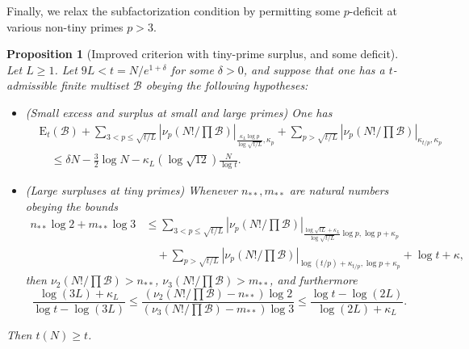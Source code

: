 \documentclass[12pt,a4paper,reqno]{amsart}
\numberwithin{equation}{section}
\theoremstyle{plain}
\newtheorem{proposition}[theorem]{Proposition}
\theoremstyle{definition}
\newcommand\tuple{{\mathcal B}}
\newcommand\excess{{\mathrm{E}}}
\begin{document}
Finally, we relax the subfactorization condition by permitting some $p$-deficit at various non-tiny primes $p>3$.

\begin{proposition}[Improved criterion with tiny-prime surplus, and some deficit]\label{balance-23''}  Let $L \geq 1$.  Let $9L < t = N/e^{1+\delta}$ for some $\delta>0$, and suppose that one has a $t$-admissible finite multiset $\tuple$ obeying the following hypotheses:
  \begin{itemize}
  \item[(i)] (Small excess and surplus at small and large primes) One has
\begin{equation}\label{new-balance-5}
    \begin{split}
&      \excess_t(\tuple) + \sum_{3 < p \leq \sqrt{t/L}}
   |\nu_p(N!/\prod \tuple)|_{\frac{\kappa_L \log p}{\log \sqrt{t/L}},\kappa_p} + 
   \sum_{p>\sqrt{t/L}} |\nu_p(N!/\prod \tuple)|_{\kappa_{t/p},\kappa_p}\\
&\quad    \leq \delta N - \frac{3}{2} \log N - \kappa_L (\log \sqrt{12}) \frac{N}{\log t}.
    \end{split}
  \end{equation}
  \item[(ii)] (Large surpluses at tiny primes) 
  Whenever $n_{**}, m_{**}$ are natural numbers obeying the bounds
  \begin{align*}
   n_{**} \log 2 + m_{**} \log 3 &\leq 
    \sum_{3 < p \leq \sqrt{t/L}}
    |\nu_p(N!/\prod \tuple)|_{\frac{\log \sqrt{tL} + \kappa_L}{\log\sqrt{t/L}} \log p,\log p+\kappa_p}\\
  &\quad   + 
    \sum_{p > \sqrt{t/L}} |\nu_p(N!/\prod \tuple)|_{\log(t/p) + \kappa_{t/p},\log p + \kappa_p}   
    + \log t + \kappa,
  \end{align*}
    then $\nu_2(N!/\prod \tuple) > n_{**}$, $\nu_3(N!/\prod \tuple) > m_{**}$, and furthermore
  $$
  \frac{\log(3L)+\kappa_L}{\log t - \log(3L)} \leq \frac{(\nu_2(N!/\prod \tuple)-n_{**}) \log 2}{(\nu_3(N!/\prod \tuple)-m_{**}) \log 3} \leq \frac{\log t - \log(2L)}{\log(2L)+\kappa_L}.
  $$
  \end{itemize}
     Then $t(N) \geq t$.
\end{proposition}
\end{document}
